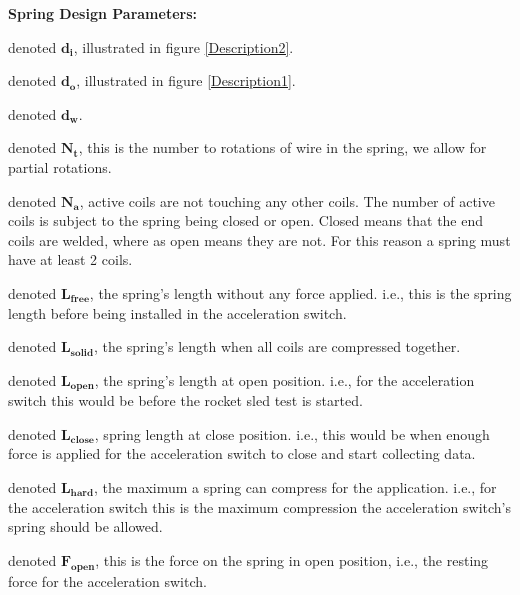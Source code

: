 \documentclass[10pt]{article}
\begin{document}
		\noindent \textbf{Spring Design Parameters:}
		\begin{description}[leftmargin=!,labelwidth=\widthof{\bfseries Ultimate torsional stress:}]
			\item [Inner Diameter] denoted $\mathbf{d_{i}}$, illustrated in figure \ref{Description2}.
			
			\item [Outer Diameter] denoted $\mathbf{d_{o}}$, illustrated in figure \ref{Description1}.
			
			\item [Wire Diameter] denoted $\mathbf{d_{w}}$.
			
			\item[Total Coils] denoted $\mathbf{N_{t}}$, this is the number to rotations of wire in the spring, we allow for partial rotations.
			
			\item[Active Coils] denoted $\mathbf{N_{a}}$, active coils are not touching any other coils. The number of active coils is subject to the spring being closed or open. Closed means that the end coils are welded, where as open means they are not. For this reason a spring must have at least 2 coils.

			\item[Free Length] denoted $\mathbf{L_{free}}$, the spring's length without any force applied. i.e., this is the spring length before being installed in the acceleration switch.
			
			\item[Solid Length] denoted $\mathbf{L_{solid}}$, the spring's length when all coils are compressed together.
			\item[Open Length] denoted $\mathbf{L_{open}}$, the spring's length at open position. i.e., for the acceleration switch this would be before the rocket sled test is started. 
			
			\item[Close Length] denoted $\mathbf{L_{close}}$, spring length at close position. i.e., this would be when enough force is applied for the acceleration switch to close and start collecting data.
			
			\item[Hard Length] denoted $\mathbf{L_{hard}}$, the maximum a spring can compress for the application. i.e., for the acceleration switch this is the maximum compression the acceleration switch's spring should be allowed. 
			
			\item[Open Force] denoted $\mathbf{F_{open}}$, this is the force on the spring in open position, i.e., the resting force for the acceleration switch.
					

\end{description}
\end{document}
